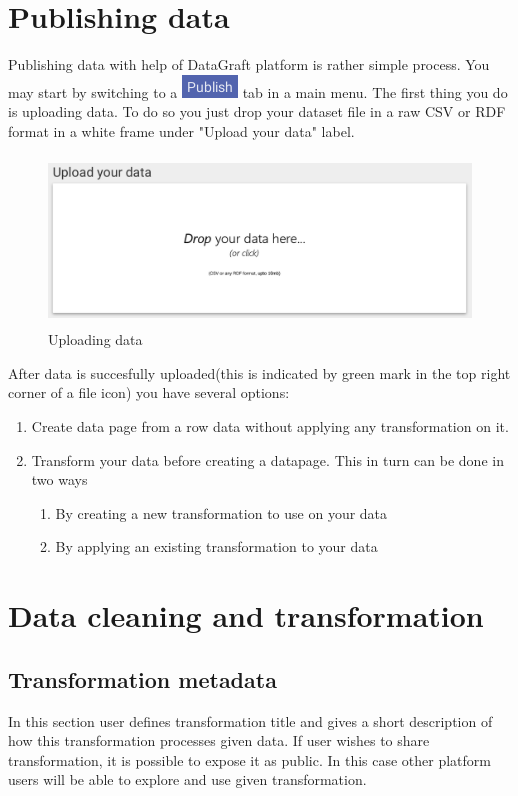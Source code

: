 \documentclass[USenglish]{article}
\begin{document}
\section{Publishing data \label{publish}}
Publishing data with help of DataGraft platform is rather simple process. You may start by switching to a {\includegraphics[scale=0.8]{publish.png}} tab in a main menu. The first thing you do is uploading data. To do so you just drop your dataset file in a raw CSV or RDF format in a white frame under "Upload your data" label. 
\begin{center}
\begin{figure}[!htbp]
\centering
\includegraphics[height=4.5cm] {upload.png}
 \caption{Uploading data \label{meta}}
\end{figure}
\end{center}
After data is succesfully uploaded(this is indicated by green mark in the top right corner of a file icon) you have several options:
	\begin{enumerate}
	\item Create data page from a row data without applying any transformation on it.
	\item Transform your data before creating a datapage. This in turn can be done in two ways	
	\begin{enumerate}
	\item By creating a new transformation to use on your data
	\item By applying an existing transformation to your data
	\end{enumerate}
	\end{enumerate}
	
\section{Data cleaning and transformation}



\subsection{Transformation metadata}
In this section user defines transformation title and gives a short description of how this transformation processes given data. If user wishes to share transformation, it is possible to expose it as public. In this case other platform users will be able to explore and use given transformation.
\end{document}

